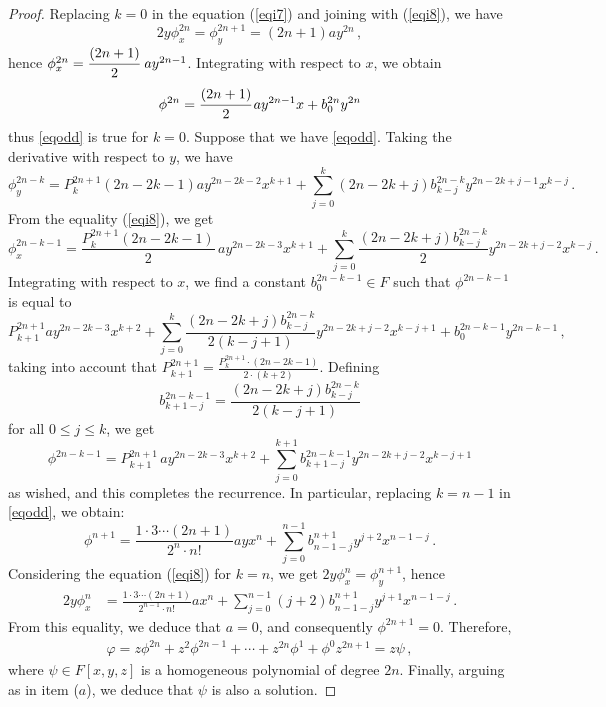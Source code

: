 \documentclass{amsart}
\begin{document}
\begin{proof}
	Replacing $k=0$ in the equation (\ref{eqi7}) and joining with  (\ref{eqi8}), we have
	\begin{equation*} 
		2y\phi^{2n}_x=\phi^{2n+1}_y=(2n+1)ay^{2n}\,,
	\end{equation*} 
	hence $\phi_x^{2n}=\cfrac{(2n+1)}{2}\, \, ay^{2n-1}$.
	Integrating with respect to $x$, we obtain
	\begin{equation*}
		\phi^{2n}=\cfrac{(2n+1)}{2}\,a y^{2n-1}x+b^{2n}_{0}y^{2n}
	\end{equation*}
	thus \eqref{eqodd} is true for $k=0$. 
	Suppose that we have \eqref{eqodd}. Taking the derivative with respect to $y$, we have
	$$\phi^{2n-k}_y=P^{2n+1}_{k}(2n-2k-1)ay^{2n-2k-2}x^{k+1}+\sum_{j=0}^{k}(2n-2k+j)b^{2n-k}_{k-j}y^{2n-2k+j-1}x^{k-j}\,.$$
	From the equality (\ref{eqi8}), we get 
	$$\phi^{2n-k-1}_x=\frac{P^{2n+1}_{k} (2n-2k-1)}{2}\, ay^{2n-2k-3}x^{k+1}+\sum_{j=0}^{k}\frac{(2n-2k+j)b^{2n-k}_{k-j}}{2}y^{2n-2k+j-2}x^{k-j}\,.$$
	Integrating with respect to $x$, we find a constant $b^{2n-k-1}_{0}\in F$ such that $\phi^{2n-k-1}$ is equal to
	$$P^{2n+1}_{k+1}ay^{2n-2k-3}x^{k+2}+\sum_{j=0}^{k}\frac{(2n-2k+j)b^{2n-k}_{k-j}}{2(k-j+1)}y^{2n-2k+j-2}x^{k-j+1}+b^{2n-k-1}_{0}y^{2n-k-1}\,,$$
	taking into account that $ \displaystyle P^{2n+1}_{k+1}=\frac{P^{2n+1}_{k}\cdot (2n-2k-1)}{2\cdot (k+2)}$. Defining $$\displaystyle b^{2n-k-1}_{k+1-j}=\frac{(2n-2k+j)b^{2n-k}_{k-j}}{2(k-j+1)}$$ for all $0\leq j\leq k $, we get
	$$\phi^{2n-k-1}=P^{2n+1}_{k+1}\, ay^{2n-2k-3}x^{k+2}+\sum_{j=0}^{k+1}b^{2n-k-1}_{k+1-j}y^{2n-2k+j-2}x^{k-j+1}$$
	as wished, and this completes the recurrence. In particular, replacing $k=n-1$ in \eqref{eqodd}, we obtain:
	\begin{equation*}
		\phi^{n+1}=\frac{1\cdot 3\cdots (2n+1)}{2^{n}\cdot n!}ayx^{n}+\sum_{j=0}^{n-1}b^{n+1}_{n-1-j}y^{j+2}x^{n-1-j}\,.
	\end{equation*}
	Considering the equation (\ref{eqi8}) for  $k=n$,  we get $2y\phi^{n}_x=\phi^{n+1}_y$, hence
	\begin{align}%
		2y\phi^{n}_x&=\frac{1\cdot 3\cdots (2n+1)}{2^{n-1}\cdot n!}ax^{n}+\sum_{j=0}^{n-1}(j+2)b^{n+1}_{n-1-j}y^{j+1}x^{n-1-j}\,.
	\end{align}
	From this equality, we deduce that $a=0$, and consequently $\phi^{2n+1}=0$. Therefore,
	\begin{align*}
		\varphi=z\phi^{2n}+z^2\phi^{2n-1}+\cdots+ z^{2n}\phi^{1}+\phi^0 z^{2n+1}=z\psi\,,
	\end{align*}
	where $\psi\in F[x,y,z]$  is a homogeneous polynomial  of degree $2n$. Finally, arguing as in item ($a$), we deduce that $\psi$ is also a solution.
	
\end{proof}
\end{document}
